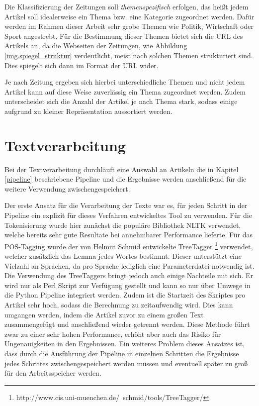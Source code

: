 Die Klassifizierung der Zeitungen soll \emph{themenspezifisch} erfolgen, das heißt jedem Artikel soll idealerweise ein Thema bzw. eine Kategorie zugeordnet werden. Dafür werden im Rahmen dieser Arbeit sehr grobe Themen wie Politik, Wirtschaft oder Sport angestrebt. Für die Bestimmung dieser Themen bietet sich die URL des Artikels an, da die Webseiten der Zeitungen, wie Abbildung \ref{img.spiegel_struktur} verdeutlicht, meist nach solchen Themen strukturiert sind. Dies spiegelt sich dann im Format der URL wider.


Je nach Zeitung ergeben sich hierbei unterschiedliche Themen und nicht jedem Artikel kann auf diese Weise zuverlässig ein Thema zugeordnet werden. Zudem unterscheidet sich die Anzahl der Artikel je nach Thema stark, sodass einige aufgrund zu kleiner Repräsentation aussortiert werden.

\section{Textverarbeitung}\label{textprocessing}
Bei der Textverarbeitung durchläuft eine Auswahl an Artikeln die in Kapitel \ref{pipeline} beschriebene Pipeline und die Ergebnisse werden anschließend für die weitere Verwendung zwischengespeichert.

Der erste Ansatz für die Verarbeitung der Texte war es, für jeden Schritt in der Pipeline ein explizit für dieses Verfahren entwickeltes Tool zu verwenden. Für die Tokenisierung wurde hier zunächst die populäre Bibliothek NLTK verwendet, welche bereits sehr gute Resultate bei annehmbarer Performance lieferte. Für das POS-Tagging wurde der von Helmut Schmid entwickelte TreeTagger \footnote{http://www.cis.uni-muenchen.de/~schmid/tools/TreeTagger/} verwendet, welcher zusätzlich das Lemma jedes Wortes bestimmt. Dieser unterstützt eine Vielzahl an Sprachen, da pro Sprache lediglich eine Parameterdatei notwendig ist. Die Verwendung des TreeTaggers bringt jedoch auch einige Nachteile mit sich. Er wird nur als Perl Skript zur Verfügung gestellt und kann so nur über Umwege in die Python Pipeline integriert werden. Zudem ist die Startzeit des Skriptes pro Artikel sehr hoch, sodass die Berechnung zu zeitaufwendig wird. Dies kann umgangen werden, indem die Artikel zuvor zu einem großen Text zusammengefügt und anschließend wieder getrennt werden. Diese Methode führt zwar zu einer sehr hohen Performance, erhöht aber auch das Risiko für Ungenauigkeiten in den Ergebnissen. Ein weiteres Problem dieses Ansatzes ist, dass durch die Ausführung der Pipeline in einzelnen Schritten die Ergebnisse jedes Schrittes zwischengespeichert werden müssen und eventuell später zu groß für den Arbeitsspeicher werden.

